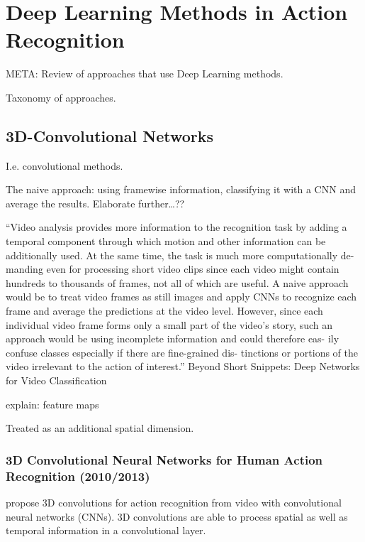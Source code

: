 \section{Deep Learning Methods in Action Recognition}
META: Review of approaches that use Deep Learning methods.

Taxonomy of approaches.


\subsection{3D-Convolutional Networks}
I.e. convolutional methods.

The naive approach: using framewise information, classifying it with a CNN and average the results. Elaborate further\ldots ??

``Video analysis provides more information to the recognition task by adding a temporal component through which motion and other information can be additionally used. At
the same time, the task is much more computationally de-
manding even for processing short video clips since each
video might contain hundreds to thousands of frames, not
all of which are useful. A naive approach would be to treat
video frames as still images and apply CNNs to recognize
each frame and average the predictions at the video level.
However, since each individual video frame forms only a
small part of the video’s story, such an approach would
be using incomplete information and could therefore eas-
ily confuse classes especially if there are fine-grained dis-
tinctions or portions of the video irrelevant to the action of
interest.'' Beyond Short Snippets: Deep Networks for Video Classification

explain: feature maps

Treated as an additional spatial dimension.


\subsubsection{3D Convolutional Neural Networks for Human Action Recognition (2010/2013)}

\textcite{ji_3d_2013} propose 3D convolutions for action recognition from video with convolutional neural networks (CNNs).
3D convolutions are able to process spatial as well as temporal information in a convolutional layer.

